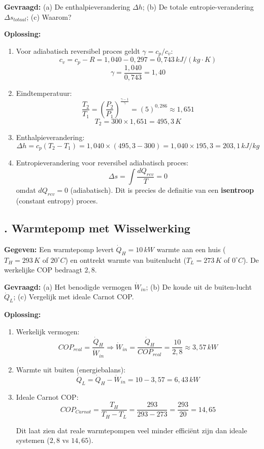 \documentclass[a4paper,11pt,twoside]{report}
\newcounter{opgave}[section]
\newcommand{\opgave}[1]{%
    \refstepcounter{opgave}%
    \subsection*{\textbf{\arabic{opgave}.} #1}%
}
\begin{document}
\textbf{Gevraagd:}
(a) De enthalpieverandering $\Delta h$; (b) De totale entropie-verandering $\Delta s_{totaal}$; (c) Waarom?

\textbf{Oplossing:}
\begin{enumerate}
    \item Voor adiabatisch reversibel proces geldt $\gamma = c_p/c_v$:
    \[ c_v = c_p - R = 1,040 - 0,297 = 0,743 \, kJ/(kg \cdot K) \]
    \[ \gamma = \frac{1,040}{0,743} = 1,40 \]
    
    \item Eindtemperatuur:
    \[ \frac{T_2}{T_1} = \left(\frac{P_2}{P_1}\right)^{\frac{\gamma-1}{\gamma}} = (5)^{0,286} \approx 1,651 \]
    \[ T_2 = 300 \times 1,651 = 495,3 \, K \]
    
    \item Enthalpieverandering:
    \[ \Delta h = c_p (T_2 - T_1) = 1,040 \times (495,3 - 300) = 1,040 \times 195,3 = 203,1 \, kJ/kg \]
    
    \item Entropieverandering voor reversibel adiabatisch proces:
    \[ \Delta s = \int \frac{dQ_{rev}}{T} = 0 \]
    omdat $dQ_{rev} = 0$ (adiabatisch).
    Dit is precies de definitie van een \textbf{isentroop} (constant entropy) proces.
\end{enumerate}

\opgave{Warmtepomp met Wisselwerking}
\textbf{Gegeven:}
Een warmtepomp levert $\dot{Q}_H = 10 \, kW$ warmte aan een huis ($T_H = 293 \, K$ of $20^\circ C$) en onttrekt warmte van buitenlucht ($T_L = 273 \, K$ of $0^\circ C$).
De werkelijke COP bedraagt $2,8$.

\textbf{Gevraagd:}
(a) Het benodigde vermogen $\dot{W}_{in}$; (b) De koude uit de buiten-lucht $\dot{Q}_L$; (c) Vergelijk met ideale Carnot COP.

\textbf{Oplossing:}
\begin{enumerate}
    \item Werkelijk vermogen:
    \[ COP_{real} = \frac{\dot{Q}_H}{\dot{W}_{in}} \Rightarrow \dot{W}_{in} = \frac{\dot{Q}_H}{COP_{real}} = \frac{10}{2,8} \approx 3,57 \, kW \]
    
    \item Warmte uit buiten (energiebalans):
    \[ \dot{Q}_L = \dot{Q}_H - \dot{W}_{in} = 10 - 3,57 = 6,43 \, kW \]
    
    \item Ideale Carnot COP:
    \[ COP_{Carnot} = \frac{T_H}{T_H - T_L} = \frac{293}{293 - 273} = \frac{293}{20} = 14,65 \]
    
    Dit laat zien dat reale warmtepompen veel minder efficiënt zijn dan ideale systemen ($2,8$ vs $14,65$).
\end{enumerate}
\end{document}
